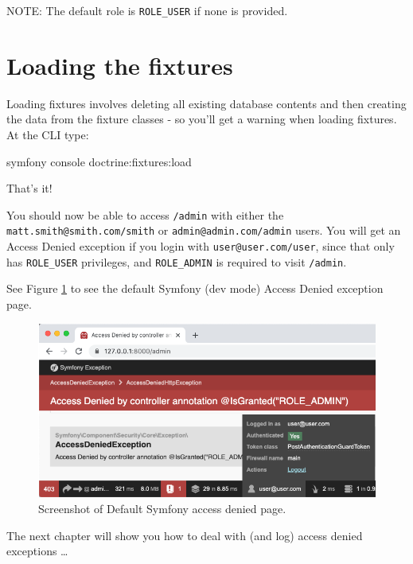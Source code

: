 \documentclass[a4paperpaper,openright]{book}
\newenvironment{Shaded}{}{}
\newcommand{\ExtensionTok}[1]{#1}
\newcommand{\NormalTok}[1]{#1}
\begin{document}
NOTE: The default role is \texttt{ROLE\_USER} if none is provided.

\hypertarget{loading-the-fixtures}{%
\section{Loading the fixtures}\label{loading-the-fixtures}}

Loading fixtures involves deleting all existing database contents and
then creating the data from the fixture classes - so you'll get a
warning when loading fixtures. At the CLI type:

\begin{Shaded}
\begin{Highlighting}[]
    \ExtensionTok{symfony}\NormalTok{ console doctrine:fixtures:load}
\end{Highlighting}
\end{Shaded}

That's it!

You should now be able to access \texttt{/admin} with either the
\texttt{matt.smith@smith.com/smith} or \texttt{admin@admin.com/admin}
users. You will get an Access Denied exception if you login with
\texttt{user@user.com/user}, since that only has \texttt{ROLE\_USER}
privileges, and \texttt{ROLE\_ADMIN} is required to visit
\texttt{/admin}.

See Figure \ref{denied_exception} to see the default Symfony (dev mode)
Access Denied exception page.

\begin{figure}
\centering
\includegraphics{./tex2pdf.-40a8cafc9587c9a0/f181b091bf6a4a0a60d5cb4a8121508d7ac4b938.png}
\caption{Screenshot of Default Symfony access denied page.
\label{denied_exception}}
\end{figure}

The next chapter will show you how to deal with (and log) access denied
exceptions \ldots{}
\end{document}
